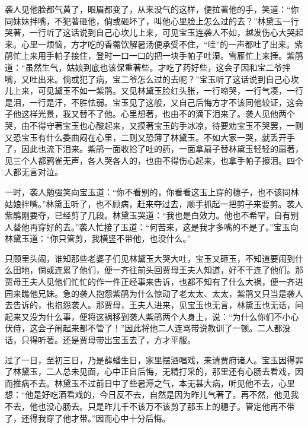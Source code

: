 \begin{parag}
    袭人见他脸都气黄了，眼眉都变了，从来没气的这样，便拉著他的手，笑道：“你同妹妹拌嘴，不犯著砸他，倘或砸坏了，叫他心里脸上怎么过的去？”林黛玉一行哭著，一行听了这话说到自己心坎儿上来，可见宝玉连袭人不如，越发伤心大哭起来。心里一烦恼，方才吃的香薷饮解暑汤便承受不住，“哇”的一声都吐了出来。紫鹃忙上来用手帕子接住，登时一口一口的把一块手帕子吐湿。雪雁忙上来捶。紫鹃道：“虽然生气，姑娘到底也该保重著些。才吃了药好些，这会子因和宝二爷拌嘴，又吐出来。倘或犯了病，宝二爷怎么过的去呢？”宝玉听了这话说到自己心坎儿上来，可见黛玉不如一紫鹃。又见林黛玉脸红头胀，一行啼哭，一行气凑，一行是泪，一行是汗，不胜怯弱。宝玉见了这般，又自己后悔方才不该同他较证，这会子他这样光景，我又替不了他。心里想著，也由不的滴下泪来了。袭人见他两个哭，由不得守著宝玉也心酸起来，又摸著宝玉的手冰凉，待要劝宝玉不哭罢，一则又恐宝玉有什么委曲闷在心里，二则又恐薄了林黛玉。不如大家一哭，就丢开手了，因此也流下泪来。紫鹃一面收拾了吐的药，一面拿扇子替林黛玉轻轻的扇著，见三个人都鸦雀无声，各人哭各人的，也由不得伤心起来，也拿手帕子擦泪。四个人都无言对泣。
\end{parag}


\begin{parag}
    一时，袭人勉强笑向宝玉道：“你不看别的，你看看这玉上穿的穗子，也不该同林姑娘拌嘴。”林黛玉听了，也不顾病，赶来夺过去，顺手抓起一把剪子来要剪。袭人紫鹃刚要夺，已经剪了几段。林黛玉哭道：“我也是白效力。他也不希罕，自有别人替他再穿好的去。”袭人忙接了玉道：“何苦来，这是我才多嘴的不是了。”宝玉向林黛玉道：“你只管剪，我横竖不带他，也没什么。”
\end{parag}


\begin{parag}
    只顾里头闹，谁知那些老婆子们见林黛玉大哭大吐，宝玉又砸玉，不知道要闹到什么田地，倘或连累了他们，便一齐往前头回贾母王夫人知道，好不干连了他们。那贾母王夫人见他们忙忙的作一件正经事来告诉，也都不知有了什么大祸，便一齐进园来瞧他兄妹。急的袭人抱怨紫鹃为什么惊动了老太太、太太，紫鹃又只当是袭人去告诉的，也抱怨袭人。那贾母，王夫人进来，见宝玉也无言，林黛玉也无话，问起来又没为什么事，便将这祸移到袭人紫鹃两个人身上，说：“为什么你们不小心伏侍，这会子闹起来都不管了！”因此将他二人连骂带说教训了一顿。二人都没话，只得听著。还是贾母带出宝玉去了，方才平服。
\end{parag}


\begin{parag}
    过了一日，至初三日，乃是薛蟠生日，家里摆酒唱戏，来请贾府诸人。宝玉因得罪了林黛玉，二人总未见面，心中正自后悔，无精打采的，那里还有心肠去看戏，因而推病不去。林黛玉不过前日中了些暑溽之气，本无甚大病，听见他不去，心里想：“他是好吃酒看戏的，今日反不去，自然是因为昨儿气著了。再不然，他见我不去，他也没心肠去。只是昨儿千不该万不该剪了那玉上的穗子。管定他再不带了，还得我穿了他才带。”因而心中十分后悔。
\end{parag}


